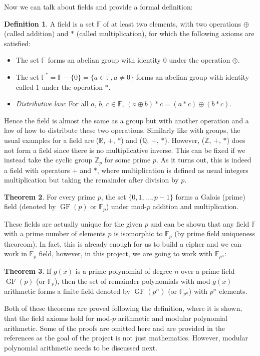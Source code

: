 \documentclass{Resources/UoBLab1}
\theoremstyle{definition}
\newtheorem{theorem}{Theorem}[section]
\newtheorem{definition}[theorem]{Definition}
\begin{document}
Now we can talk about fields and provide a formal definition:
\begin{definition}
    A field is a set $\mathbb{F}$ of at least two elements, with two operations $\oplus$ (called addition) and $*$ (called multiplication), for which the following axioms are satisfied:
    \begin{itemize}
        \item The set $\mathbb{F}$ forms an abelian group with identity $0$ under the operation $\oplus$.
        \item The set $\mathbb{F}^* = \mathbb{F} - \{0\} = \{a \in \mathbb{F}, a \ne 0\}$ forms an abelian group with identity called $1$ under the operation $*$.
        \item \textit{Distributive law}: For all $a$, $b$, $c \in \mathbb{F}$, $(a \oplus b) * c = (a * c) \oplus (b * c)$.
    \end{itemize}
\end{definition}
Hence the field is almost the same as a group but with another operation and a law of how to distribute these two operations. Similarly like with groups, the usual examples for a field are ($\mathbb{R}$, $+$, $*$) and ($\mathbb{Q}$, $+$, $*$). However, ($\mathbb{Z}$, $+$, $*$) does not form a field since there is no multiplicative inverse. This can be fixed if we instead take the cyclic group $\mathbb{Z}_p$ for some prime $p$. As it turns out, this is indeed a field with operators $+$ and $*$, where multiplication is defined as usual integers multiplication but taking the remainder after division by $p$.
\begin{theorem}
    For every prime $p$, the set $\{0, 1, ... , p - 1\}$ forms a Galois (prime) field (denoted by $\operatorname{GF}(p)$ or $\mathbb{F}_p$) under mod-$p$ addition and multiplication.
\end{theorem}
These fields are actually unique for the given $p$ and can be shown that any field $\mathbb{F}$ with a prime number of elements $p$ is isomorphic to $\mathbb{F}_p$ (by prime field uniqueness theoreom\cite{FieldNotes}). In fact, this is already enough for us to build a cipher and we can work in $\mathbb{F}_p$ field, however, in this project, we are going to work with $\mathbb{F}_{p^n}$:
\begin{theorem}
    If $g(x)$ is a prime polynomial of degree $n$ over a prime field $\operatorname{GF}(p)$ (or $\mathbb{F}_p$), then the set of remainder polynomials with mod-$g(x)$ arithmetic forms a finite field denoted by $\operatorname{GF}(p^n)$ (or $\mathbb{F}_{p^n}$) with $p^n$ elements.
\end{theorem}
Both of these theorems are proved following the definition, where it is shown, that the field axioms hold for mod-$p$ arithmetic and modular polynomial arithmetic\cite{FieldNotes}. Some of the proofs are omitted here and are provided in the references as the goal of the project is not just mathematics. However, modular polynomial arithmetic needs to be discussed next.
\end{document}
